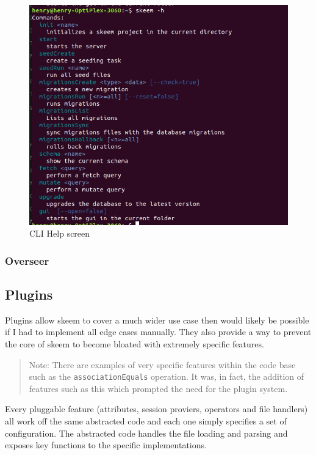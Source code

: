 \documentclass[
  12pt,
]{article}
\newcommand{\passthrough}[1]{#1}
\begin{document}
\begin{figure}
\centering
\includegraphics{./images/cli-help.png}
\caption{CLI Help screen}
\end{figure}

\hypertarget{overseer-1}{%
\subsubsection{Overseer}\label{overseer-1}}

\hypertarget{plugins-1}{%
\subsection{Plugins}\label{plugins-1}}

Plugins allow skeem to cover a much wider use case then would likely be
possible if I had to implement all edge cases manually. They also
provide a way to prevent the core of skeem to become bloated with
extremely specific features.

\begin{quote}
Note: There are examples of very specific features within the code base
such as the \passthrough{\lstinline!associationEquals!} operation. It
was, in fact, the addition of features such as this which prompted the
need for the plugin system.
\end{quote}

Every pluggable feature (attributes, session proviers, operators and
file handlers) all work off the same abstracted code and each one simply
specifies a set of configuration. The abstracted code handles the file
loading and parsing and exposes key functions to the specific
implementations.
\end{document}
